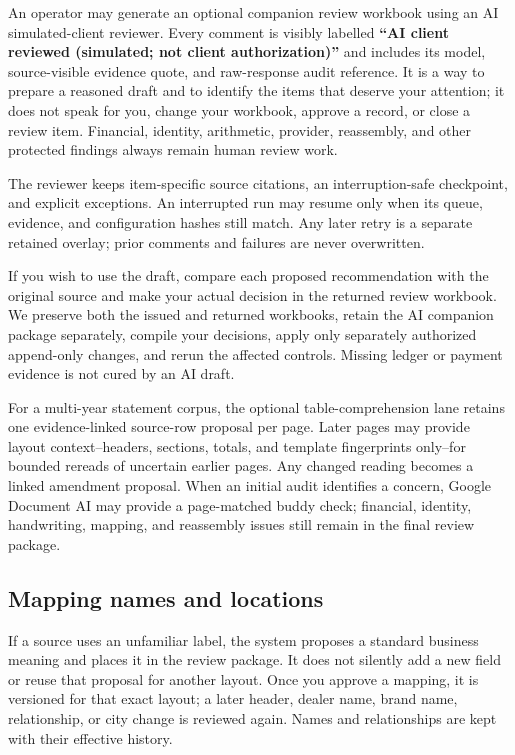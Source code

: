 \documentclass[
]{article}
\begin{document}
An operator may generate an optional companion review workbook using an
AI simulated-client reviewer. Every comment is visibly labelled
\textbf{``AI client reviewed (simulated; not client authorization)''}
and includes its model, source-visible evidence quote, and raw-response
audit reference. It is a way to prepare a reasoned draft and to identify
the items that deserve your attention; it does not speak for you, change
your workbook, approve a record, or close a review item. Financial,
identity, arithmetic, provider, reassembly, and other protected findings
always remain human review work.

The reviewer keeps item-specific source citations, an interruption-safe
checkpoint, and explicit exceptions. An interrupted run may resume only
when its queue, evidence, and configuration hashes still match. Any
later retry is a separate retained overlay; prior comments and failures
are never overwritten.

If you wish to use the draft, compare each proposed recommendation with
the original source and make your actual decision in the returned review
workbook. We preserve both the issued and returned workbooks, retain the
AI companion package separately, compile your decisions, apply only
separately authorized append-only changes, and rerun the affected
controls. Missing ledger or payment evidence is not cured by an AI
draft.

For a multi-year statement corpus, the optional table-comprehension lane
retains one evidence-linked source-row proposal per page. Later pages
may provide layout context--headers, sections, totals, and template
fingerprints only--for bounded rereads of uncertain earlier pages. Any
changed reading becomes a linked amendment proposal. When an initial
audit identifies a concern, Google Document AI may provide a
page-matched buddy check; financial, identity, handwriting, mapping, and
reassembly issues still remain in the final review package.

\subsection{Mapping names and
locations}\label{mapping-names-and-locations}

If a source uses an unfamiliar label, the system proposes a standard
business meaning and places it in the review package. It does not
silently add a new field or reuse that proposal for another layout. Once
you approve a mapping, it is versioned for that exact layout; a later
header, dealer name, brand name, relationship, or city change is
reviewed again. Names and relationships are kept with their effective
history.
\end{document}

